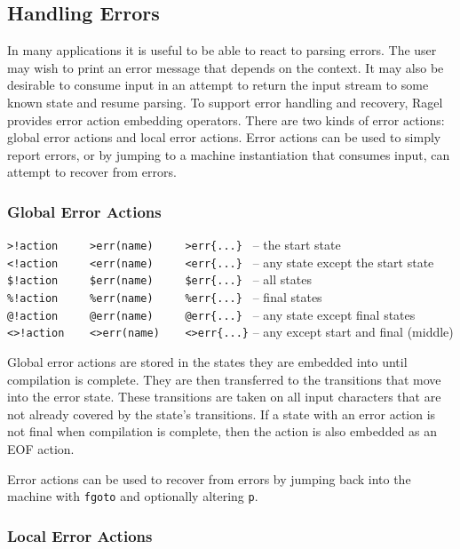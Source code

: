 \documentclass[letterpaper,11pt,oneside]{book}
\begin{document}
\subsection{Handling Errors}

In many applications it is useful to be able to react to parsing errors.  The
user may wish to print an error message that depends on the context.  It
may also be desirable to consume input in an attempt to return the input stream
to some known state and resume parsing. To support error handling and recovery,
Ragel provides error action embedding operators. There are two kinds of error
actions: global error actions and local error actions.
Error actions can be used to simply report errors, or by jumping to a machine
instantiation that consumes input, can attempt to recover from errors.  

\subsubsection{Global Error Actions}

\sasp\verb|>!action     >err(name)     >err{...} | -- the start state\\
\sasp\verb|<!action     <err(name)     <err{...} | -- any state except the start state\\
\sasp\verb|$!action     $err(name)     $err{...} | -- all states\\
\sasp\verb|%!action     %err(name)     %err{...} | -- final states\\
\sasp\verb|@!action     @err(name)     @err{...} | -- any state except final states\\
\sasp\verb|<>!action    <>err(name)    <>err{...}| -- any except start and final (middle)
\vspace{12pt}

Global error actions are stored in the states they are embedded into until
compilation is complete. They are then transferred to the transitions that move
into the error state. These transitions are taken on all input characters that
are not already covered by the state's transitions. If a state with an error
action is not final when compilation is complete, then the action is also
embedded as an EOF action.

Error actions can be used to recover from errors by jumping back into the
machine with \verb|fgoto| and optionally altering \verb|p|.

\subsubsection{Local Error Actions}
\end{document}
